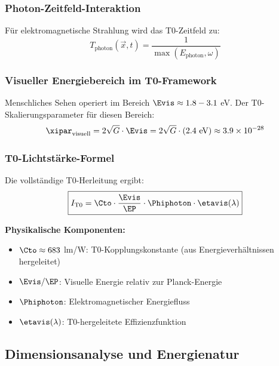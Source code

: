 	\subsubsection{Photon-Zeitfeld-Interaktion}
	\label{subsubsec:photon_zeitfeld}
	
	Für elektromagnetische Strahlung wird das T0-Zeitfeld zu:
	\begin{equation}
		T_{\text{photon}}(\vec{x},t) = \frac{1}{\max(E_{\text{photon}}, \omega)}
		\label{eq:photon_zeitfeld}
	\end{equation}
	
	\subsubsection{Visueller Energiebereich im T0-Framework}
	\label{subsubsec:visueller_energiebereich}
	
	Menschliches Sehen operiert im Bereich $\Evis \approx 1.8 - 3.1$ eV. Der T0-Skalierungsparameter für diesen Bereich:
	\begin{equation}
		\xipar_{\text{visuell}} = 2\sqrt{G} \cdot \Evis = 2\sqrt{G} \cdot (2.4 \text{ eV}) \approx 3.9 \times 10^{-28}
		\label{eq:xi_visuell}
	\end{equation}
	
	\subsubsection{T0-Lichtstärke-Formel}
	\label{subsubsec:t0_lichtstaerke_formel}
	
	Die vollständige T0-Herleitung ergibt:
	\begin{equation}
		\boxed{I_{\text{T0}} = \Cto \cdot \frac{\Evis}{\EP} \cdot \Phiphoton \cdot \etavis(\lambda)}
		\label{eq:t0_candela_fundamental}
	\end{equation}
	
	\textbf{Physikalische Komponenten:}
	\begin{itemize}
		\item $\Cto \approx 683$ lm/W: T0-Kopplungskonstante (aus Energieverhältnissen hergeleitet)
		\item $\Evis/\EP$: Visuelle Energie relativ zur Planck-Energie
		\item $\Phiphoton$: Elektromagnetischer Energiefluss
		\item $\etavis(\lambda)$: T0-hergeleitete Effizienzfunktion
	\end{itemize}
	
	\subsection{Dimensionsanalyse und Energienatur}
	\label{subsec:candela_dimensional}
	
